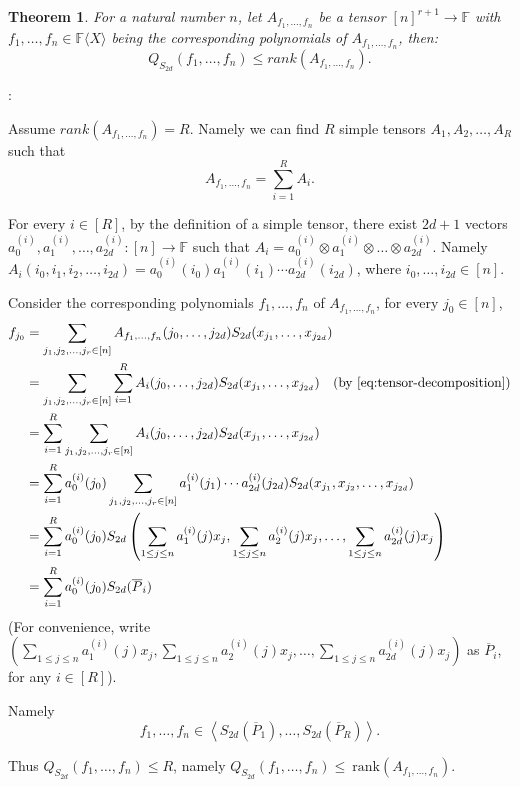\documentclass[12pt,reqno]{article}
\newtheorem{theorem}{Theorem}
\newcommand\F{\ensuremath{\mathbb F}}
\newcommand{\freea}{\ensuremath{\F\langle X\rangle}}
\newenvironment{proof}{\QuadSpace\par\noindent{\bf Proof}:}{\EndProof\HalfSpace}
\newcommand{\QuadSpace}{\vspace{0.25\baselineskip}}
\newcommand{\HalfSpace}{\vspace{0.5\baselineskip}}
\newcommand{\EndProof}{ \hfill \vrule width 1ex height 1ex depth 0pt }
\newcommand{\nx}[1]{#1_1,\ldots,#1_{n}}
\renewcommand{\a}{a^{(i)}}
\renewcommand{\t}[1]{\overline{#1}}
\newcommand{\ideal}[1]{\ensuremath{\left\langle #1\right\rangle}}
\begin{document}
\begin{theorem}
For a natural number $n$, let $A_{\nx{f}}$ be a tensor $[n]^{r+1}\rightarrow \F$ with  $\nx{f}\in\freea$ being   the corresponding polynomials of $A_{\nx{f}}$, then:$$Q_{S_{2d}}(\nx{f})\leq rank(A_{\nx{f}}).$$
\end{theorem}

\begin{proof}


Assume $rank(A_{\nx{f}})=R$. Namely  we can find  $R$  simple tensors  $A_1,A_2,\ldots, A_R$ such that
\begin{equation}\label{eq:tensor-decomposition}
  A_{\nx{f}} = \sum_{i=1}^R A_i.
\end{equation}

For every $i\in[R]$,  by the definition of a simple tensor, there exist $2d+1$ vectors $\a_0,\a_1,\ldots,\a_{2d}:[n]\to \F$ such that $A_i=\a_0\otimes \a_1\otimes \dots \otimes \a_{2d}$. Namely  $A_i(i_0,i_1,i_2,\ldots, i_{2d})=\a_0(i_0)\a_1(i_1) \cdots \a_{2d}(i_{2d})$, where $i_0 ,\ldots,  i_{2d}\in[n]$.

Consider the corresponding polynomials $ \nx{f}$ of $A_{\nx{f}}$, for every $j_0\in[n]$,
\begin{align*}
f_{j_0}&=\sum_{j_1,j_2,\ldots,j_{r}\in [n]}A_{\nx{f}}(j_0,\ldots,j_{2d})S_{2d}(x_{j_1},\ldots, x_{j_{2d}})\\
&=\sum_{j_1,j_2,\ldots,j_{r}\in [n]}\sum_{i=1}^RA_i(j_0,\ldots, j_{2d})S_{2d}(x_{j_1},\ldots, x_{j_{2d}})~~~\text{(by \ref{eq:tensor-decomposition})}\\
&=\sum_{i=1}^R\sum_{j_1,j_2,\ldots,j_{r}\in [n]}A_i(j_0,\ldots, j_{2d})S_{2d}(x_{j_1},\ldots, x_{j_{2d}})\\
&=\sum_{i=1}^R \a_{0}(j_0)\sum_{j_1,j_2,\ldots,j_{r}\in [n]}\a_1(j_1)\cdots \a_{2d}(j_{2d})S_{2d}(x_{j_1},x_{j_2},\ldots, x_{j_{2d}})\\
&=\sum_{i=1}^R \a_0(j_0)S_{2d}\left(\sum_{1\leq j\leq n}\a_1(j)x_j,\sum_{1\leq j\leq n}\a_2(j)x_j,\ldots,\sum_{1\leq j\leq n}\a_{2d}(j)x_j\right)\\
&=\sum_{i=1}^R \a_0(j_0)S_{2d}(\t P_i)\\
\end{align*}
(For convenience, write $\left(\sum_{1\leq j\leq n}\a_1(j)x_j,\sum_{1\leq j\leq n}\a_2(j)x_j,\ldots,\sum_{1\leq j\leq n}\a_{2d}(j)x_j\right)$ as $\t P_i$, for any $i\in[R]$).

Namely $$\nx{f}\in\ideal{S_{2d}\left(\t P_1\right),\ldots,S_{2d} \left(\t P_R\right)}.$$


Thus $ Q_{S_{2d}}(\nx{f})\leq R$, namely $Q_{S_{2d}}(\nx{f})\leq ~\text{rank}(A_{\nx{f}})$.
\end{proof}
\end{document}
